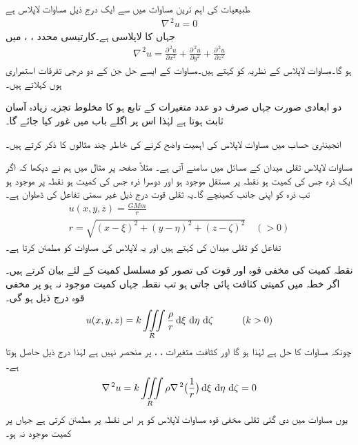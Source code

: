 طبیعیات کی اہم ترین مساوات میں سے ایک درج ذیل مساوات لاپلاس  ہے
\begin{align}\label{مساوات_جزوی_لاپلاس_الف}
\nabla^{\,2}u=0
\end{align}
جہاں  کا لاپلاسی    ہے۔کارتیسی محدد ، ،  میں
\begin{align}\label{مساوات_جزوی_لاپلاس_ب}
\nabla^{\,2}u=\frac{\partial^{\,2}u}{\partial x^2}+\frac{\partial^{\,2}u}{\partial y^2}+\frac{\partial^{\,2}u}{\partial z^2}
\end{align}
ہو گا۔مساوات لاپلاس کے نظریہ کو  کہتے ہیں۔مساوات  کے ایسے حل جن کے دو درجی تفرقات استمراری ہوں  کہلاتے ہیں۔

دو ابعادی صورت جہاں  صرف دو عدد متغیرات کے تابع ہو کا مخلوط تجزیہ زیادہ آسان ثابت ہوتا ہے لہٰذا اس پر اگلے باب میں غور کیا جائے گا۔

انجینئری حساب میں مساوات لاپلاس کی اہمیت واضح کرنے کی خاطر چند مثالوں کا ذکر کرتے ہیں۔

مساوات لاپلاس ثقلی میدان کے مسائل میں سامنے آتی ہے۔  مثلاً صفحہ  پر مثال  میں ہم نے دیکھا کہ اگر ایک ذرہ  جس کی کمیت  ہو نقطہ  پر مستقل موجود ہو اور دوسرا ذرہ  جس کی کمیت  ہو نقطہ  پر موجود ہو تب  ذرہ  کو اپنی جانب کھینچے گا۔یہ ثقلی قوت درج ذیل غیر سمتی تفاعل  کی ڈھلوان ہے۔
\begin{align*}
u(x,y,z)=\frac{GMm}{r}\\
r=\sqrt{(x-\xi)^2+(y-\eta)^2+(z-\zeta)^2}\quad (>0)
\end{align*}
تفاعل  کو ثقلی میدان کی  کہتے ہیں اور یہ لاپلاس کی مساوات کو مطمئن کرتا ہے۔ 

نقطہ کمیت کی مخفی قوہ اور قوت کی تصور کو مسلسل کمیت کے لئے بیان کرتے ہیں۔اگر خطہ  میں کمیتی کثافت  پائی جاتی ہو تب  نقطہ  جہاں کمیت موجود نہ ہو  پر مخفی قوہ  درج ذیل ہو گی۔ 
\begin{align}\label{مساوات_جزوی_لاپلاس_پ}
u(x,y,z)=k\iiint\limits_R \frac{\rho}{r}\dif \xi\,\dif \eta\,\dif \zeta\quad \quad \quad (k>0)
\end{align}
چونکہ  مساوات  کا حل ہے لہٰذا  ہو گا اور کثافت   متغیرات ، ،  پر منحصر نہیں ہے لہٰذا درج ذیل حاصل ہوتا ہے۔
\begin{align*}
\nabla^{\,2}u=k\iiint\limits_R \rho\nabla^{\,2}\big(\frac{1}{r}\big) \dif \xi\,\dif \eta\,\dif \zeta=0
\end{align*}
یوں مساوات  میں دی گئی ثقلی مخفی قوہ مساوات لاپلاس کو ہر اس نقطہ پر مطمئن کرتی ہے جہاں پر کمیت موجود نہ ہو۔

